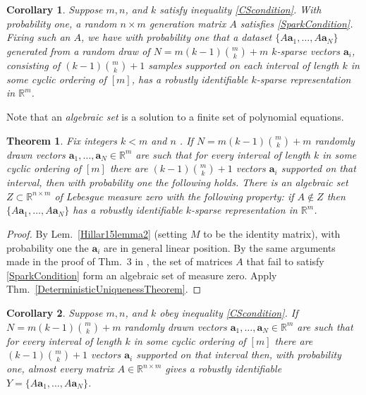 \documentclass[journal, twocolumn]{IEEEtran}
\newtheorem{theorem}{Theorem}
\newtheorem{corollary}{Corollary}
\begin{document}
\begin{corollary}
Suppose $m, n$, and $k$ satisfy inequality \eqref{CScondition}. With probability one, a random $n \times m$ generation matrix $A$ satisfies \eqref{SparkCondition}. Fixing such an $A$, we have with probability one that a dataset $\{A\mathbf{a}_1, \ldots , A\mathbf{a}_N\}$ generated from a random draw of $N = m(k-1){m \choose k}+m$ $k$-sparse vectors $\mathbf{a}_i$, consisting of $(k-1){m \choose k}+1$ samples supported on each interval of length $k$ in some cyclic ordering of $[m]$, has a robustly identifiable $k$-sparse representation in $\mathbb{R}^m$.
\end{corollary}

Note that an \emph{algebraic set} is a solution to a finite set of polynomial equations. 

\begin{theorem}\label{Theorem3}
Fix integers $k < m$ and $n$ . If $N = m(k-1){m \choose k}+m$ randomly drawn vectors $\mathbf{a}_1, \ldots, \mathbf{a}_N \in \mathbb{R}^m$ are such that for every interval of length $k$ in some cyclic ordering of $[m]$ there are $(k-1){m \choose k}+1$ vectors $\mathbf{a}_i$ supported on that interval, then with probability one the following holds. There is an algebraic set $Z \subset \mathbb{R}^{n \times m}$ of Lebesgue measure zero with the following property: if $A \notin Z$ then $\{A\mathbf{a}_1, \ldots , A\mathbf{a}_N \}$ has a robustly identifiable $k$-sparse representation in $\mathbb{R}^m$.
\end{theorem}

\begin{proof}
By Lem.~\ref{Hillar15lemma2} (setting $M$ to be the identity matrix), with probability one the $\mathbf{a}_i$ are in general linear position. By the same arguments made in the proof of Thm.~3 in \cite{Hillar15}, the set of matrices $A$ that fail to satisfy \eqref{SparkCondition} form an algebraic set of measure zero. Apply Thm.~\ref{DeterministicUniquenessTheorem}.
\end{proof}

\begin{corollary}
Suppose $m, n$, and $k$ obey inequality \eqref{CScondition}.  If $N = m(k-1){m \choose k}+m$ randomly drawn vectors $\mathbf{a}_1, \ldots, \mathbf{a}_N \in \mathbb{R}^m$ are such that for every interval of length $k$ in some cyclic ordering of $[m]$ there are $(k-1){m \choose k}+1$ vectors $\mathbf{a}_i$ supported on that interval then, with probability one, almost every matrix $A \in \mathbb{R}^{n \times m}$ gives a robustly identifiable $Y = \{A\mathbf{a}_1, \ldots , A\mathbf{a}_N \}$.
\end{corollary}
\end{document}
